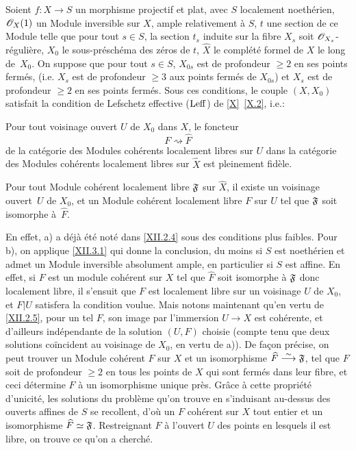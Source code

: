 \begin{corollaire} \label{XII.3.4}
Soient $f:X\to S$ un morphisme projectif et plat, avec $S$ localement noeth\'erien, $\mathscr{O}_X(1)$ un Module inversible sur $X$, ample relativement \`a $S$, $t$ une section de ce Module telle que pour tout $s\in S$, la section $t_s$ induite sur la fibre $X_s$ soit ${\mathscr O}_{X_s}$-r\'eguli\`ere, $X_0$ le sous-pr\'esch\'ema des z\'eros de $t$, $\widehat{X}$ le compl\'et\'e formel de $X$ le long de~$X_0$. On suppose que pour tout $s\in S$, $X_{0s}$ est de profondeur $\geq 2$ en ses points ferm\'es, (i.e. $X_s$ est de profondeur $\geq 3$ aux points ferm\'es de $X_{0s}$) et $X_s$ est de profondeur $\geq 2$ en ses points ferm\'es. Sous ces conditions, le couple $(X, X_0)$ satisfait la condition de Lefschetz effective ($\operatorname{Leff}$) de \ref{X}~\ref{X.2}, i.e.:
\begin{enumeratea}
\item
Pour tout voisinage ouvert $U$ de $X_0$ dans $X$, le foncteur
\[
F \rightsquigarrow \widehat{F}
\]
de la cat\'egorie des Modules coh\'erents localement libres sur $U$ dans la cat\'egorie des Modules coh\'erents localement libres sur $\widehat{X}$ est pleinement fid\`ele.
\item
Pour tout Module coh\'erent localement libre $\mathfrak{F}$ sur $\widehat{X}$, il existe un voisinage ouvert~$U$ de $X_0$, et un Module coh\'erent localement libre $F$ sur $U$ tel que $\mathfrak{F}$ soit isomorphe \`a~$\widehat{F}$.
\end{enumeratea}
\end{corollaire}

En effet, a) a d\'ej\`a \'et\'e not\'e dans \ref{XII.2.4} sous des conditions plus faibles. Pour b), on applique \ref{XII.3.1} qui donne la conclusion, du moins si $S$ est noeth\'erien et admet un Module inversible absolument ample, en particulier si $S$ est affine. En effet, si $F$ est un module coh\'erent sur $X$ tel que $\widehat{F}$ soit isomorphe \`a $\mathfrak{F}$ donc localement libre, il s'ensuit que $F$ est localement libre sur un voisinage $U$ de $X_0$, et $F|U$ satisfera la condition voulue. Mais notons maintenant qu'en vertu de \ref{XII.2.5}, pour un tel $F$, son image par l'immersion $U\to X$ est coh\'erente, et d'ailleurs ind\'ependante de la solution $(U, F)$ choisie (compte tenu \ignorespaces que deux solutions co\"incident au voisinage de $X_0$, en vertu de a)). De fa\c con pr\'ecise, on peut trouver un Module coh\'erent $F$ sur $X$ et un isomorphisme $\widehat{F}\overset{\sim}{\longrightarrow} \mathfrak{F}$, tel que $F$ soit de profondeur $\geq 2$ en tous les points de $X$ qui sont ferm\'es dans leur fibre, et ceci d\'etermine $F$ \`a un isomorphisme unique pr\`es. Gr\^ace \`a cette propri\'et\'e d'unicit\'e, les solutions du probl\`eme qu'on trouve en s'induisant au-dessus des ouverts affines de $S$ se recollent, d'o\`u un $F$ coh\'erent sur $X$ tout entier et un isomorphisme $\widehat{F}\simeq \mathfrak{F}$. Restreignant $F$ \`a l'ouvert $U$ des points en lesquels il est libre, on trouve ce qu'on a cherch\'e.

